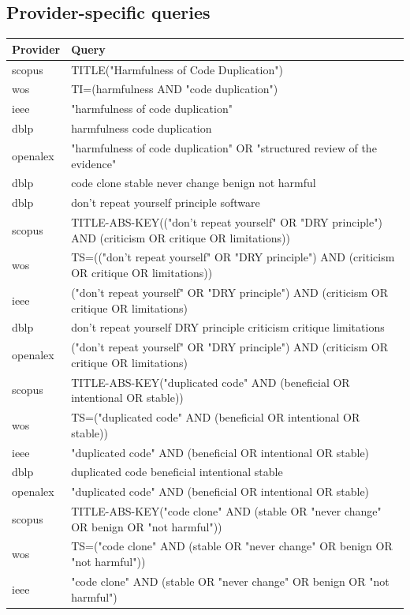 \documentclass{article}
\begin{document}
\subsection{Provider-specific queries}
\begin{longtable}{lp{10cm}}
\toprule
Provider & Query \\
\midrule
scopus & TITLE("Harmfulness of Code Duplication") \\
wos & TI=(harmfulness AND "code duplication") \\
ieee & "harmfulness of code duplication" \\
dblp & harmfulness code duplication \\
openalex & "harmfulness of code duplication" OR "structured review of the evidence" \\
dblp & code clone stable never change benign not harmful \\
dblp & don't repeat yourself principle software \\
scopus & TITLE-ABS-KEY(("don't repeat yourself" OR "DRY principle") AND (criticism OR critique OR limitations)) \\
wos & TS=(("don't repeat yourself" OR "DRY principle") AND (criticism OR critique OR limitations)) \\
ieee & ("don't repeat yourself" OR "DRY principle") AND (criticism OR critique OR limitations) \\
dblp & don't repeat yourself DRY principle criticism critique limitations \\
openalex & ("don't repeat yourself" OR "DRY principle") AND (criticism OR critique OR limitations) \\
scopus & TITLE-ABS-KEY("duplicated code" AND (beneficial OR intentional OR stable)) \\
wos & TS=("duplicated code" AND (beneficial OR intentional OR stable)) \\
ieee & "duplicated code" AND (beneficial OR intentional OR stable) \\
dblp & duplicated code beneficial intentional stable \\
openalex & "duplicated code" AND (beneficial OR intentional OR stable) \\
scopus & TITLE-ABS-KEY("code clone" AND (stable OR "never change" OR benign OR "not harmful")) \\
wos & TS=("code clone" AND (stable OR "never change" OR benign OR "not harmful")) \\
ieee & "code clone" AND (stable OR "never change" OR benign OR "not harmful") \\

\end{longtable}
\end{document}
